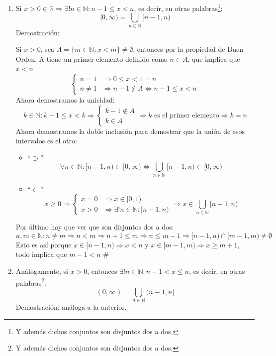 \documentclass[10pt,a4paper,openright]{book}
\begin{document}
\begin{enumerate}
\item Si $x>0\in \mathbb R\Rightarrow \exists! n \in \mathbb N: n-1\leq x< n$, es decir, en otras palabras\footnote{Y además dichos conjuntos son disjuntos dos a dos.}:
$$[0,\infty)=\bigcup_{n\in \mathbb N}[n-1,n)$$
Demostración:\par
Si $x>0$, sea $A=\{m\in \mathbb N: x<m\}\neq \emptyset$, entonces por la propiedad de Buen Orden, A tiene un primer elemento definido como $n\in A$, que implica que $x<n$
$$\begin{cases}n=1 &\Rightarrow 0\leq x<1=n\\
n\neq 1 &\Rightarrow n-1\notin A\Leftrightarrow n-1\leq x< n\end{cases}$$
Ahora demostramos la unicidad:
$$k\in \mathbb N: k-1\leq x<k\Rightarrow \begin{cases}k-1 \notin A \\ k \in A\end{cases}\Rightarrow k \mbox{ es el primer elemento}\Rightarrow k=n$$
Ahora demostramos la doble inclusión para demostrar que la unión de esos intervalos es el otro:
	\begin{itemize}
	\item ``$\supset$''
	$$\forall n \in \mathbb N: [n-1,n)\subset [0,\infty)\Leftrightarrow \bigcup_{n\in \mathbb N}[n-1,n) \subset [0,\infty)$$
	
	\item ``$\subset$''
	$$x\geq 0\Rightarrow \begin{cases} x=0 & \Rightarrow x\in [0,1) \\ x>0 & \Rightarrow \exists! n \in \mathbb N : [n-1,n)	
	\end{cases}\Rightarrow x\in \bigcup_{n\in \mathbb N}[n-1,n) $$
	\end{itemize}

Por último hay que ver que son disjuntos dos a dos:
$$n,m\in \mathbb N: n\neq m\Rightarrow n<m\Rightarrow n+1\leq m\Rightarrow n\leq m-1\Rightarrow [n-1,n)\cap [m-1,m)\neq \emptyset$$
Esto es así porque $x\in [n-1,n)\Rightarrow x<n$ y $x\in [m-1,m)\Rightarrow x\geq m+1$, todo implica que $m-1<n$ \#
\vspace{0.15cm}

\item Análogamente, si $x>0$, entonces $\exists! n \in \mathbb N: n-1< x\leq n$, es decir, en otras palabras\footnote{Y además dichos conjuntos son disjuntos dos a dos.}:
$$(0,\infty)=\bigcup_{n\in \mathbb N}(n-1,n]$$
Demostración: análoga a la anterior.
\vspace{0.15cm}


\end{enumerate}
\end{document}
